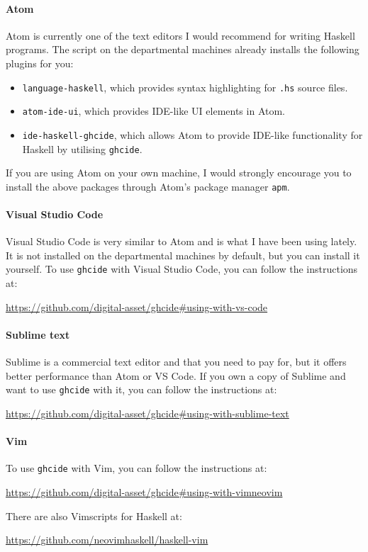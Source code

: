 \paragraph{Atom} Atom is currently one of the text editors I would recommend for writing Haskell programs. The  script on the departmental machines already installs the following plugins for you:
\begin{itemize}
	\item \texttt{\small language-haskell}, which provides syntax highlighting for \texttt{\small .hs} source files.
	\item \texttt{\small atom-ide-ui}, which provides IDE-like UI elements in Atom.
	\item \texttt{\small ide-haskell-ghcide}, which allows Atom to provide IDE-like functionality for Haskell by utilising \texttt{\small ghcide}. 
\end{itemize}
If you are using Atom on your own machine, I would strongly encourage you to install the above packages through Atom's package manager \texttt{\small apm}.

\paragraph{Visual Studio Code} Visual Studio Code is very similar to Atom and is what I have been using lately. It is not installed on the departmental machines by default, but you can install it yourself. To use \texttt{\small ghcide} with Visual Studio Code, you can follow the instructions at:
\begin{center}\small
	\parbox{14cm}{\centering\url{https://github.com/digital-asset/ghcide\#using-with-vs-code}}
\end{center}

\paragraph{Sublime text} Sublime is a commercial text editor and that you need to pay for, but it offers better performance than Atom or VS Code. If you own a copy of Sublime and want to use \texttt{\small ghcide} with it, you can follow the instructions at:
\begin{center}\small 
	\url{https://github.com/digital-asset/ghcide#using-with-sublime-text}
\end{center}

\paragraph{Vim} To use \texttt{\small ghcide} with Vim, you can follow the instructions at:
\begin{center}\small
	\url{https://github.com/digital-asset/ghcide#using-with-vimneovim}
\end{center}
There are also Vimscripts for Haskell at:
\begin{center}\small
\url{https://github.com/neovimhaskell/haskell-vim}
\end{center}

